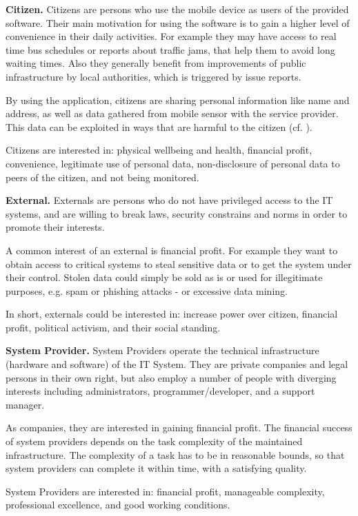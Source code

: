\documentclass[runningheads,a4paper]{llncs}
\begin{document}
\textbf{Citizen.}
Citizens are persons who use the mobile device as users of the provided software.
Their main motivation for using the software is to gain a higher level of convenience in their daily activities. For example they may have access to real time bus schedules or reports about traffic jams, that help them to avoid long waiting times. Also they generally benefit from improvements of public infrastructure by local authorities, which is triggered by issue reports.

By using the application, citizens are sharing personal information like name and address, as well as data gathered from mobile sensor with the service provider. This data can be exploited in ways that are harmful to the citizen (cf. \cite{GuardienMassSurveillance}).

Citizens are interested in: physical wellbeing and health, financial profit, convenience, legitimate use of personal data, non-disclosure of personal data to peers of the citizen, and not being monitored.

\textbf{External.}
Externals are persons who do not have privileged access to the IT systems, and are willing to break laws, security constrains and norms in order to promote their interests. 

A common interest of an external is financial profit. For example they want to obtain access to critical systems to steal sensitive data or to get the system under their control. Stolen data could simply be sold as is or used for illegitimate purposes, e.g. spam or phishing attacks - or excessive data mining.

In short, externals could be interested in: increase power over citizen, financial profit, political activism, and their social standing.

\textbf{System Provider.}
System Providers operate the technical infrastructure (hardware and software) of the IT System.
They are private companies and legal persons in their own right, but also employ a number of people with diverging interests including administrators, programmer/developer, and a support manager.

As companies, they are interested in gaining financial profit. The financial success of system providers depends on the task complexity of the maintained infrastructure. The complexity of a task has to be in reasonable bounds, so that system providers can complete it within time, with a satisfying quality.

System Providers are interested in: financial profit, manageable complexity, professional excellence, and good working conditions.
\end{document}
